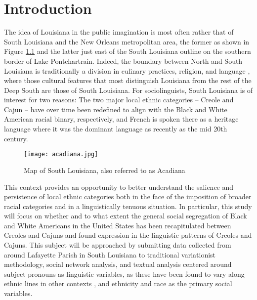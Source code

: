 \chapter{Introduction}
  The idea of Louisiana in the public imagination is most often rather that of South Louisiana and the New Orleans metropolitan area, the former as shown in Figure \ref{fig:south_la} and the latter just east of the South Louisiana outline on the southern border of Lake Pontchartrain.
  Indeed, the boundary between North and South Louisiana is traditionally a division in culinary practices, religion, and language \parencite[p.~309]{trepanier_french_1988}, where those cultural features that most distinguish Louisiana from the rest of the Deep South are those of South Louisiana.
  For sociolinguists, South Louisiana is of interest for two reasons: The two major local ethnic categories -- Creole and Cajun -- have over time been redefined to align with the Black and White American racial binary, respectively, and French is spoken there as a heritage language where it was the dominant language as recently as the mid 20th century.

  \begin{figure}[tbhp]
    \centering
    \caption{Map of South Louisiana, also referred to as Acadiana}
    \label{fig:south_la}
    \texttt{[image: acadiana.jpg]}
  \end{figure}

  This context provides an opportunity to better understand the salience and persistence of local ethnic categories both in the face of the imposition of broader racial categories and in a linguistically tenuous situation.
  In particular, this study will focus on whether and to what extent the general social segregation of Black and White Americans in the United States \parencite{smith_social_2014} has been recapitulated between Creoles and Cajuns and found expression in the linguistic patterns of Creoles and Cajuns.
  This subject will be approached by submitting data collected from around Lafayette Parish in South Louisiana to traditional variationist methodology, social network analysis, and textual analysis centered around subject pronouns as linguistic variables, as these have been found to vary along ethnic lines in other contexts \parencite{dajko_ethnic_2009, rottet_language_1995}, and ethnicity and race as the primary social variables.

